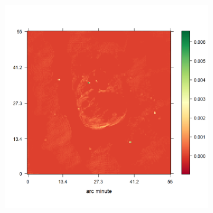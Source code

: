 \begin{figure}[h!]
\begin{subfigure}[b]{0.32\linewidth}
	\end{subfigure}
	\begin{subfigure}[b]{0.32\linewidth}
		\includegraphics[width=\linewidth, trim={20px 30px 75px 52px}, clip]{./chapters/05.results/g55/positive_deconv_model.png}
	\end{subfigure}


\end{figure}
